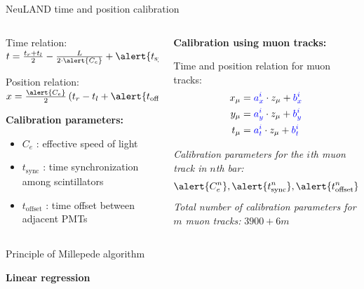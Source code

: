 \documentclass{ikpKoeln}
\begin{document}
\begin{frame}[t]{NeuLAND time and position calibration}
    \vspace*{-2em}
	\begin{columns}[t]
		\begin{column}{0.45\textwidth}
			\begin{block}{\small Time relation:}
				\centering
				$ t = \frac{t_r + t_l}{2} - \frac{L}{2 \cdot \alert{C_e}} + \alert{t_\text{sync}}$
			\end{block}

			\begin{block}{\small Position relation:}
				\centering
				$ x = \frac{\alert{C_e}}{2}\left( t_r - t_l  + \alert{t_\text{offset}} \right)$
			\end{block}
			\flushleft\textbf{Calibration parameters:}
			\begin{itemize}
				\item \alert{$C_e$}  : effective speed of light
				\item \alert{$t_\text{sync}$} : time synchronization among scintillators
				\item \alert{$t_\text{offset}$} : time offset between adjacent PMTs
			\end{itemize}

		\end{column}
		\begin{column}{0.45\textwidth}
			\flushleft\textbf{Calibration using muon tracks:}
			\begin{block}{\small Time and position relation for muon tracks:}
				\centering
				\vspace*{-1.5em}
				\begin{align}
					\small
					x_\mu & = \textcolor{blue}{a^i_x} \cdot z_\mu  + \textcolor{blue}{b^i_x} \\
					y_\mu & = \textcolor{blue}{a^i_y} \cdot z_\mu  + \textcolor{blue}{b^i_y} \\
					t_\mu & = \textcolor{blue}{a^i_t} \cdot z_\mu  + \textcolor{blue}{b^i_t}
				\end{align}
			\end{block}
			\flushleft\textit{\small Calibration parameters for the $i$th muon track in $n$th bar:}
			$$\alert{C^n_e}, \alert{t^n_\text{sync}}, \alert{t^n_\text{offset}},\textcolor{blue}{a^i_x}, \textcolor{blue}{a^i_y}, \textcolor{blue}{a^i_t}, \textcolor{blue}{b^i_x}, \textcolor{blue}{b^i_y}, \textcolor{blue}{b^i_t} $$
			\flushleft\textit{\small Total number of calibration parameters for $m$ muon tracks:} $ 3900 + 6m$
		\end{column}
	\end{columns}
\end{frame}

\begin{frame}[t]{Principle of Millepede algorithm}
    \begin{center}
        \textbf{Linear regression}
    \end{center}
    
\end{frame}
\end{document}

